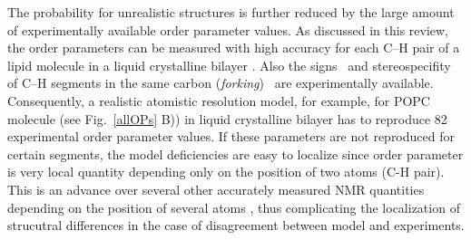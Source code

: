 \documentclass[aps,prl,superscriptaddress,twocolumn]{revtex4}
\begin{document}
The probability for unrealistic structures is further reduced by the large amount of experimentally 
available order parameter values. As discussed in this review, the order parameters can be measured
with high accuracy for each C--H pair of a lipid molecule in a liquid crystalline 
bilayer \cite{seelig77c,jacobs81,davis83,gross97,dvinskikh05a,ferreira13,botan15}.
Also the signs~\cite{hong95a,hong95b,gross97} and stereospecifity of C--H segments 
in the same carbon ({\it forking})~\cite{seelig75,gally81,engel81,gross97,dvinskikh05a,ferreira13}
are experimentally available. Consequently, a realistic atomistic resolution model,
for example, for POPC molecule (see Fig.~\ref{allOPs} B)) in liquid crystalline bilayer has to reproduce 82 experimental
order parameter values.
If these parameters are not reproduced for certain segments, the model deficiencies are easy to localize
since order parameter is very local quantity depending only on the position of two atoms (C-H pair).
This is an advance over several other accurately measured NMR quantities  
depending on the position of several atoms \cite{prakash10,chowdhary13}, thus complicating the localization of strucutral differences 
in the case of disagreement between model and experiments.
\end{document}

